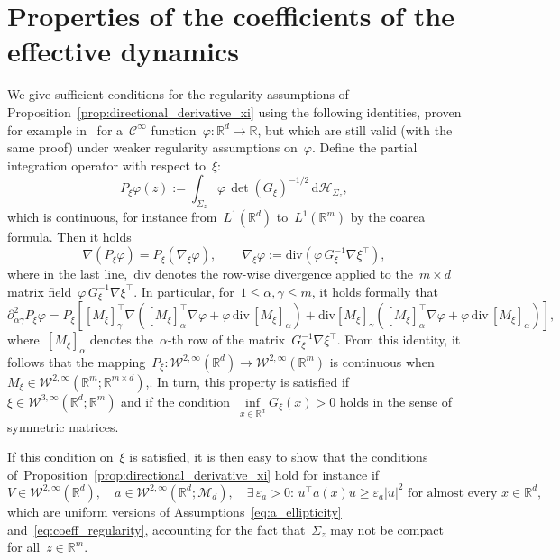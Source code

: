 \documentclass[a4]{article}
\renewcommand{\d}{\mathrm{d}}
\renewcommand{\div}{\mathrm{div}}
\newcommand{\R}{\mathbb{R}}
\newcommand{\1}{\mathbbm 1}
\newcommand{\cW}{\mathcal{W}}
\begin{document}
\section{Properties of the coefficients of the effective dynamics}
\label{sec:tech_reg}
    We give sufficient conditions for the regularity assumptions of Proposition~\ref{prop:directional_derivative_xi} using the following identities, proven for example in~\cite[Lemma 3.10]{LRS10} for a~$\mathcal C^\infty$ function~$\varphi:\R^d\to\R$, but which are still valid (with the same proof) under weaker regularity assumptions on~$\varphi$.
        Define the partial integration operator with respect to~$\xi$:
        \begin{equation}
            P_\xi\varphi(z) := \int_{\Sigma_z} \varphi\,\det(G_\xi)^{-1/2}\,\d \mathcal{H}_{\Sigma_z},
        \end{equation}
        which is continuous, for instance from~$L^1(\R^d)$ to~$L^1(\R^m)$ by the coarea formula. Then it holds
        \begin{equation}
            \nabla \left(P_\xi \varphi\right) = P_\xi \left(\nabla_\xi \varphi\right),\qquad \nabla_\xi\varphi := \div\left(\varphi\,G_\xi^{-1}\nabla\xi^\top\right),
        \end{equation}
        where in the last line,~$\div$ denotes the row-wise divergence applied to the~$m\times d$ matrix field~$\varphi\,G_\xi^{-1}\nabla\xi^\top$.
        In particular, for~$1\leq \alpha,\gamma\leq m$, it holds formally that
        \begin{equation}
            \partial^2_{\alpha\gamma} P_\xi \varphi = P_\xi\left[\left[M_\xi\right]_{\gamma}^\top\nabla\left(\left[M_\xi\right]_{\alpha}^\top \nabla \varphi + \varphi\,\div\,\left[M_\xi\right]_\alpha\right) + \div\left[M_\xi\right]_{\gamma}\left(\left[M_\xi\right]_{\alpha}^\top \nabla \varphi + \varphi\,\div\,\left[M_\xi\right]_\alpha\right)\right],
        \end{equation}
        where~$\left[M_\xi\right]_\alpha$ denotes the~$\alpha$-th row of the matrix~$G_\xi^{-1}\nabla\xi^\top$.
        From this identity, it follows that the mapping~$P_\xi:\mathcal W^{2,\infty}(\R^d)\to \mathcal W^{2,\infty}(\R^m)$ is continuous when~$M_\xi \in \cW^{2,\infty}(\R^m;\R^{m\times d})$,.
        In turn, this property is satisfied if~$\xi\in \cW^{3,\infty}(\R^d;\R^m)$ and if the condition~$\underset{x\in\R^d}{\inf} G_\xi(x) > 0$ holds in the sense of symmetric matrices.

        If this condition on~$\xi$ is satisfied, it is then easy to show that the conditions of~Proposition~\ref{prop:directional_derivative_xi} hold for instance if
        \begin{equation}
            V\in \cW^{2,\infty}(\R^d),\quad a\in \cW^{2,\infty}(\R^d;\mathcal M_d),\quad \exists\,\varepsilon_a>0:\,u^\top a(x)u\geq\varepsilon_a |u|^2\text{ for almost every }x\in\R^d,
        \end{equation}
        which are uniform versions of Assumptions~\eqref{eq:a_ellipticity} and~\eqref{eq:coeff_regularity}, accounting for the fact that~$\Sigma_z$ may not be compact for all~$z\in \R^m$.
\end{document}
